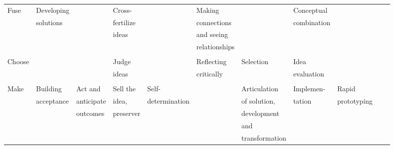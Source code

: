 \documentclass[11pt, oneside]{article}   	%
\begin{document}
\begin{landscape}
\begin{table}[ht]
\begin{tabular}{lllllllllll}
	  \\
  Fuse  				& Developing 				&  			& Cross- 		&  				& Making 			& 				& Conceptual 	&   \\ 
  	  				& solutions 				& 			& fertilize 		& 				& connections 		& 				& combination 	&  \\
					&						& 			& ideas 		& 				& and seeing \\
					&						&			& 			&				& relationships \\
	  \\
  Choose  				&  						&  			& Judge 		&  				& Reflecting 		& Selection 		& Idea  &   \\ 
  					& 						& 			& ideas 		& 				& critically 		& 				& evaluation\\
  \\
  Make  				& Building 				& Act and 		& Sell the  	& Self- 			&  				& Articulation 		& Implemen- 		& Rapid 		\\ 
            				& acceptance 				& anticipate 	& idea,		& determination		& 				& of solution,		& tation			& prototyping \\
					& 						& outcomes 	& preserver	&				&				& development		&  				& \\
           &&&&&																							& and			&  				& \\
           &&&&&																							&  transformation \\
   \hline
\end{tabular}
\end{table}
\end{landscape}
\end{document}
